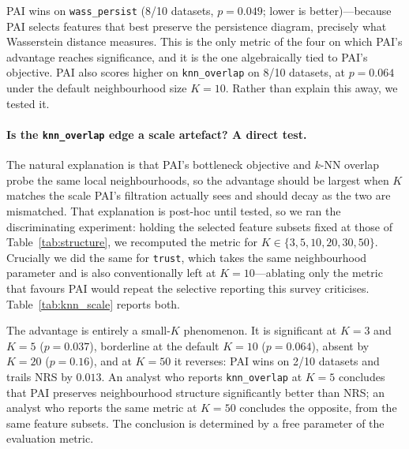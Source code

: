 

PAI wins on \texttt{wass\_persist} (8/10 datasets, $p=0.049$; lower is
better)---because PAI selects features that best preserve the persistence
diagram, precisely what Wasserstein distance measures.  This is the only
metric of the four on which PAI's advantage reaches significance, and it is
the one algebraically tied to PAI's objective.  PAI also scores higher on
\texttt{knn\_overlap} on 8/10 datasets, at $p=0.064$ under the default
neighbourhood size $K=10$.  Rather than explain this away, we tested it.

\paragraph{Is the \texttt{knn\_overlap} edge a scale artefact?  A direct test.}
The natural explanation is that PAI's bottleneck objective and $k$-NN overlap
probe the same local neighbourhoods, so the advantage should be largest when
$K$ matches the scale PAI's filtration actually sees and should decay as the
two are mismatched.  That explanation is post-hoc until tested, so we ran the
discriminating experiment: holding the selected feature subsets fixed at those
of Table~\ref{tab:structure}, we recomputed the metric for
$K \in \{3,5,10,20,30,50\}$.  Crucially we did the same for
\texttt{trust}, which takes the same neighbourhood parameter and is
also conventionally left at $K=10$---ablating only the metric that favours
PAI would repeat the selective reporting this survey criticises.
Table~\ref{tab:knn_scale} reports both.



The advantage is entirely a small-$K$ phenomenon.  It is significant at
$K=3$ and $K=5$ ($p=0.037$), borderline at the default $K=10$ ($p=0.064$),
absent by $K=20$ ($p=0.16$), and at $K=50$ it reverses: PAI wins on
2/10 datasets and trails NRS by $0.013$.  An analyst who reports
\texttt{knn\_overlap} at $K=5$ concludes that PAI preserves neighbourhood
structure significantly better than NRS; an analyst who reports the same
metric at $K=50$ concludes the opposite, from the same feature subsets.  The
conclusion is determined by a free parameter of the evaluation metric.

